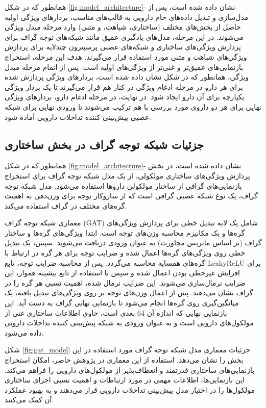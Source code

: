 همانطور که در شکل \ref{fig:model_architecture}- نشان داده شده است، پس از مدل‌سازی و تبدیل داده‌های خام دارویی به قالب‌های مناسب، بردارهای ویژگی اولیه حاصل از بخش‌های مختلف (ساختاری، شباهت، و متنی) وارد مرحله مبدل ویژگی می‌شوند. در این مرحله، مدل‌های یادگیری عمیق مانند شبکه‌های توجه گراف برای پردازش ویژگی‌های ساختاری و شبکه‌های عصبی پرسپترون چندلایه برای پردازش ویژگی‌های شباهت و متنی مورد استفاده قرار می‌گیرند. هدف این مرحله، استخراج بازنمایی‌های عمیق‌تر و غنی‌تر از ویژگی‌های اولیه است. پس از اتمام مرحله مبدل ویژگی، همانطور که در شکل نشان داده شده است، بردارهای ویژگی پردازش شده برای هر دارو در مرحله ادغام ویژگی در کنار هم قرار می‌گیرند تا یک بردار ویژگی یکپارچه برای آن دارو ایجاد شود. در نهایت، در مرحله ادغام دارو، بردارهای ویژگی نهایی برای هر دو داروی مورد بررسی با هم ترکیب می‌شوند تا ورودی نهایی برای شبکه عصبی پیش‌بینی کننده تداخلات دارویی آماده شود.


\subsection{جزئیات شبکه توجه گراف در بخش ساختاری}

همانطور که در شکل \ref{fig:model_architecture}- نشان داده شده است، در بخش پردازش ویژگی‌های ساختاری مولکولی، از یک مدل شبکه توجه گراف برای استخراج بازنمایی‌های گرافی از ساختار مولکولی داروها استفاده می‌شود. مدل شبکه توجه گراف، یک نوع شبکه عصبی گرافی است که از سازوکار توجه برای وزن‌دهی به اهمیت گره‌های مختلف در گراف استفاده می‌کند.

معماری شبکه توجه گراف (GAT) شامل یک لایه تبدیل خطی برای پردازش ویژگی‌های گره‌ها و یک مکانیزم محاسبه وزن‌های توجه است. ابتدا ویژگی‌های گره‌ها و ساختار گراف (بر اساس ماتریس مجاورت) به عنوان ورودی دریافت می‌شوند. سپس، یک تبدیل خطی روی ویژگی‌های گره‌ها اعمال شده و ضرایب توجه برای هر گره در ارتباط با گره‌های همسایه محاسبه می‌گردد. پس از محاسبه ضرایب توجه، تابع LeakyReLU برای افزایش غیرخطی بودن اعمال شده و سپس با استفاده از تابع بیشینه هموار، این ضرایب نرمال‌سازی می‌شوند. این ضرایب نرمال شده، اهمیت نسبی هر گره را در گراف نشان می‌دهند. پس از اعمال وزن‌های توجه بر روی ویژگی‌های تبدیل یافته، یک میانگین‌گیری روی گره‌ها انجام می‌شود تا بازنمایی نهایی گراف به دست آید. این بازنمایی نهایی که اندازه آن 64 بعدی است، حاوی اطلاعات ساختاری غنی از مولکول‌های دارویی است و به عنوان ورودی به شبکه پیش‌بینی کننده تداخلات دارویی داده می‌شود.

شکل \ref{fig:gat_model} جزئیات معماری مدل شبکه توجه گراف مورد استفاده در این بخش را نشان می‌دهد. استفاده از این معماری در پژوهش حاضر، امکان استخراج بازنمایی‌های ساختاری قدرتمند و انعطاف‌پذیر از مولکول‌های دارویی را فراهم می‌کند. این بازنمایی‌ها، اطلاعات مهمی در مورد ارتباطات و اهمیت نسبی اجزای ساختاری مولکول‌ها را در اختیار مدل پیش‌بینی تداخلات دارویی قرار می‌دهند و به بهبود عملکرد آن کمک می‌کنند.


